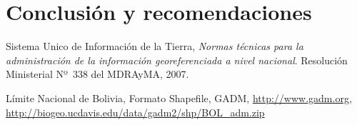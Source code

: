 \documentclass[letterpaper]{article}
\begin{document}
\section{Conclusión y recomendaciones}

\begin{thebibliography}{99}

  Sistema Unico de Información de la Tierra,
  \emph{Normas técnicas para la administración de la información georeferenciada a nivel nacional}.
  Resolución Ministerial Nº~338 del MDRAyMA,
  2007.

  Límite Nacional de Bolivia,
  Formato Shapefile,
  GADM,
  \url{http://www.gadm.org},
  \url{http://biogeo.ucdavis.edu/data/gadm2/shp/BOL_adm.zip}

\end{thebibliography}
\end{document}
